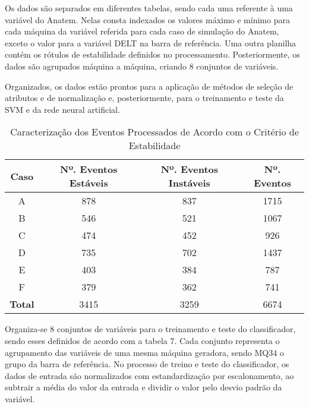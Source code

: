 \documentclass[12pt,oneside,a4paper,chapter=TITLE,section=TITLE,sumario=tradicional,english,brazil]{abntex2}
\begin{document}
\par 
Os dados são separados em diferentes tabelas, sendo cada uma referente à uma variável do Anatem. Nelas consta indexados os valores máximo e mínimo para cada máquina da variável referida para cada caso de simulação do Anatem, exceto o valor para a variável DELT na barra de referência. Uma outra planilha contém os rótulos de estabilidade definidos no processamento. Posteriormente, os dados são agrupados máquina a máquina, criando 8 conjuntos de variáveis. 
\par
Organizados, os dados estão prontos para a aplicação de métodos de seleção de atributos e de normalização e, posteriormente, para o treinamento e teste da SVM e da rede neural artificial.\par 
\begin{table}[h]
\centering
\caption{Caracterização dos Eventos Processados de Acordo com o Critério de Estabilidade}
\begin{tabular}{c|c|c|c}
\textbf{Caso}&\textbf{Nº. Eventos Estáveis}&\textbf{Nº. Eventos Instáveis}&\textbf{Nº. Eventos}\\
\hline
A&878&837&1715\\
B&546&521&1067\\
C&474&452&926\\
D&735&702&1437\\
E&403&384&787\\
F&379&362&741\\
\hline
\textbf{Total}&3415&3259&6674
\end{tabular}
\par 
\end{table}
\newpage
Organiza-se 8 conjuntos de variáveis para o treinamento e teste do classificador, sendo esses definidos de acordo com a tabela 7. Cada conjunto representa o agrupamento das variáveis de uma mesma máquina geradora, sendo MQ34 o grupo da barra de referência. No processo de treino e teste do classificador, os dados de entrada são normalizados com estandardização por escalonamento, ao subtrair a média do valor da entrada e dividir o valor pelo desvio padrão da variável.\par 
\end{document}
